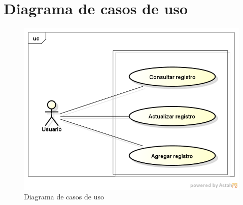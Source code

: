 \documentclass[11pt,spanish,a4paper,openany,notitlepage]{article}
\begin{document}
\section{Diagrama de casos de uso}

\begin{figure}[H]
\begin{center}
\includegraphics[width=350pt]{casos_uso.png}
\caption{Diagrama de casos de uso}
\end{center}
\end{figure}
\end{document}
